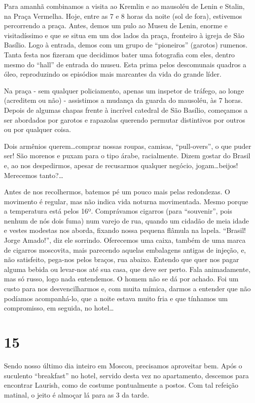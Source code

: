 Para amanhã combinamos a visita ao Kremlin e ao mausoléu de Lenin e Stalin, na Praça Vermelha. Hoje, entre as 7 e 8 horas da noite (sol de fora), estivemos percorrendo a praça. Antes, demos um pulo ao Museu de Lenin, enorme e visitadíssimo e que se situa em um dos lados da praça, fronteiro à igreja de São Basílio. Logo à entrada, demos com um grupo de “pioneiros” (garotos) rumenos. Tanta festa nos fizeram que decidimos bater uma fotografia com eles, dentro mesmo do “hall” de entrada do museu. Esta prima pelos descomunais quadros a óleo, reproduzindo os episódios mais marcantes da vida do grande líder.

Na praça - sem qualquer policiamento, apenas um inspetor de tráfego, ao longe (acreditem ou não) - assistimos a mudança da guarda do mausoléu, às 7 horas. Depois de algumas chapas frente à incrível catedral de São Basílio, começamos a ser abordados por garotos e rapazolas querendo permutar distintivos por outros ou por qualquer coisa.

Dois armênios querem\ldots comprar nossas roupas, camisas, “pull-overs”, o que puder ser! São morenos e puxam para o tipo árabe, racialmente. Dizem gostar do Brasil e, ao nos despedirmos, apesar de recusarmos qualquer negócio, jogam\ldots beijos! Merecemos tanto?\ldots

Antes de nos recolhermos, batemos pé um pouco mais pelas redondezas. O movimento é regular, mas não indica vida noturna movimentada. Mesmo porque a temperatura está pelos 16º. Comprávamos cigarros (para “souvenir”, pois nenhum de nós dois fuma) num varejo de rua, quando um cidadão de meia idade e vestes modestas nos aborda, fixando nossa pequena flâmula na lapela. “Brasil! Jorge Amado!”, diz ele sorrindo. Oferecemos uma caixa, também de uma marca de cigarros moscovita, mais parecendo aquelas embalagens antigas de injeção, e, não satisfeito, pega-nos pelos braços, rua abaixo. Entendo que quer nos pagar alguma bebida ou levar-nos até sua casa, que deve ser perto. Fala animadamente, mas só russo, logo nada entendemos. O homem não se dá por achado. Foi um custo para nos desvencilharmos e, com muita mímica, darmos a entender que não podíamos acompanhá-lo, que a noite estava muito fria e que tínhamos um compromisso, em seguida, no hotel\ldots

\section*{15 \adfflatleafright {}}
Sendo nosso último dia inteiro em Moscou, precisamos aproveitar bem. Após o suculento “breakfast” no hotel, servido desta vez no apartamento, descemos para encontrar Laurish, como de costume pontualmente a postos. Com tal refeição matinal, o jeito é almoçar lá para as 3 da tarde.

